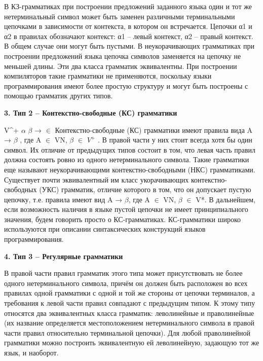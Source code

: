 В КЗ-грамматиках при построении предложений заданного языка один и тот же нетерминальный символ может быть заменен различными терминальными цепочками в зависимости от контекста, в котором он встречается. Цепочки α1 и α2 в правилах обозначают контекст: α1 – левый контекст, α2 – правый контекст. В общем случае они могут быть пустыми. В неукорачивающих грамматиках при построении предложений языка цепочка символов заменяется на цепочку не меньшей длины. Эти два класса грамматик эквивалентны. При построении компиляторов такие грамматики не применяются, поскольку языки программирования имеют более простую структуру и могут быть построены с помощью грамматик других типов.

\begin{center}{\bfseries 3. Тип 2 – Контекстно-свободные (КС) грамматики}
\end{center}

V^{+}  $\alpha$ $\beta$ → $\in$ Контекстно-свободные (КС) грамматики имеют правила вида A → $\beta$ , где A $\in$ VN, $\beta$ $\in$ $V^{+}$ . В правой части у них стоит всегда хотя бы один символ. Их отличие от предыдущих типов состоит в том, что левая часть правил должна состоять ровно из одного нетерминального символа. Такие грамматики еще называют неукорачивающими контекстно-свободными (НКС) грамматиками. Существует почти эквивалентный им класс укорачивающих контекстно- свободных (УКС) грамматик, отличие которого в том, что он допускает пустую цепочку, т.е. правила имеют вид A → $\beta$, где A $\in$ VN, $\beta$ $\in$ V*. В дальнейшем, если возможность наличия в языке пустой цепочки не имеет принципиального значения, будем говорить просто о КС-грамматиках. КС-грамматики широко используются при описании синтаксических конструкций языков программирования.

  \begin{center}{\bfseries 4. Тип 3 – Регулярные грамматики}
  \end{center}

В правой части правил грамматик этого типа может присутствовать не более одного нетерминального символа, причём он должен быть расположен во всех правилах одной грамматики с одной и той же стороны от цепочки терминалов, а требования к левой части правил совпадают с предыдущим типом. К этому типу относятся два эквивалентных класса грамматик: леволинейные и праволинейные (их название определяется местоположением нетерминального символа в правой части правил относительно терминальной цепочки). Для любой праволинейной грамматики можно построить эквивалентную ей леволинейную, задающую тот же язык, и наоборот.

